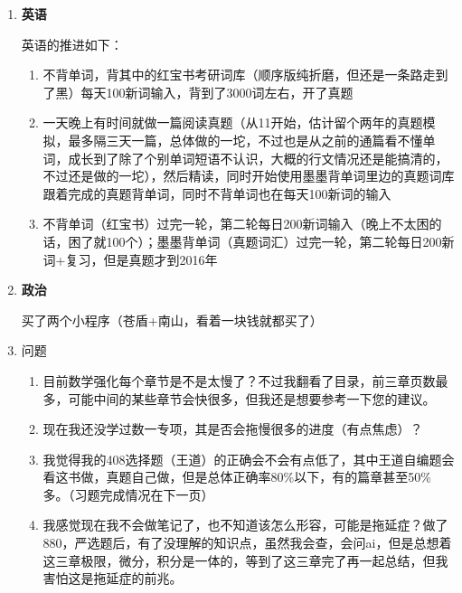 \documentclass[12pt,a4paper]{ctexart}
\begin{document}
\begin{enumerate}[leftmargin=*,itemsep=6pt]
\begin{enumerate}[label=\arabic*.,leftmargin=*]
    \item 六月中旬开始的高数强化（武忠祥辅导讲义+武忠祥强化课+严选题+880），先做一遍讲义，然后看课，然后做严选题，做880.现在已经开始第三章积分，感觉880，严选题正确率有点低了，选填+解答总的正确率没上80\%（感觉还是掌握的不行）。现在的推进速度大概是9天左右才能完成一章。
    
    \end{enumerate}
    
    \item \textbf{英语}

    英语的推进如下：

    \begin{enumerate}[label=\arabic*.,leftmargin=*]
        \item 不背单词，背其中的红宝书考研词库（顺序版纯折磨，但还是一条路走到了黑）每天100新词输入，背到了3000词左右，开了真题
        \item 一天晚上有时间就做一篇阅读真题（从11开始，估计留个两年的真题模拟，最多隔三天一篇，总体做的一坨，不过也是从之前的通篇看不懂单词，成长到了除了个别单词短语不认识，大概的行文情况还是能搞清的，不过还是做的一坨），然后精读，同时开始使用墨墨背单词里边的真题词库跟着完成的真题背单词，同时不背单词也在每天100新词的输入
        \item 不背单词（红宝书）过完一轮，第二轮每日200新词输入（晚上不太困的话，困了就100个）；墨墨背单词（真题词汇）过完一轮，第二轮每日200新词+复习，但是真题才到2016年
    \end{enumerate}

    \item \textbf{政治}

    买了两个小程序（苍盾+南山，看着一块钱就都买了）
    
    \item 问题
    \begin{enumerate}
    	\item	目前数学强化每个章节是不是太慢了？不过我翻看了目录，前三章页数最多，可能中间的某些章节会快很多，但我还是想要参考一下您的建议。
    	
    	\item	现在我还没学过数一专项，其是否会拖慢很多的进度（有点焦虑）？
    	
    	\item	我觉得我的408选择题（王道）的正确会不会有点低了，其中王道自编题会看这书做，真题自己做，但是总体正确率80\%以下，有的篇章甚至50\%多。（习题完成情况在下一页）
    	
    	\item	我感觉现在我不会做笔记了，也不知道该怎么形容，可能是拖延症？做了880，严选题后，有了没理解的知识点，虽然我会查，会问ai，但是总想着这三章极限，微分，积分是一体的，等到了这三章完了再一起总结，但我害怕这是拖延症的前兆。
    \end{enumerate}
    
\end{enumerate}
\end{document}
